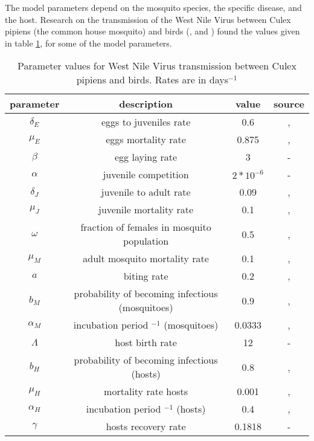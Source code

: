 \documentclass{article}
\begin{document}
The model parameters depend on the mosquito species, the specific disease, and the host. Research on the transmission of the West Nile Virus between Culex pipiens (the common house mosquito) and birds (\cite{Heidecke2024.09.16.613097}, and \cite{Vogels2017-li}) found the values given in table \ref{tab:parameters}, for some of the model parameters.
\begin{table}[h!]
\centering
\begin{tabular}{|c|c|c|c|}
\hline
\textbf{parameter} & \textbf{description} & \textbf{value} & \textbf{source}\\
\hline
$\delta_E$ & eggs to juveniles rate & 0.6 & \cite{Heidecke2024.09.16.613097}, \cite{Vogels2017-li}\\
$\mu_E$ & eggs mortality rate & 0.875 & \cite{Heidecke2024.09.16.613097}, \cite{Vogels2017-li}\\
$\beta$ & egg laying rate & 3 & -\\
$\alpha$ & juvenile competition & $2*10^{-6}$ & -\\
$\delta_J$ & juvenile to adult rate & 0.09 & \cite{Heidecke2024.09.16.613097}, \cite{Vogels2017-li}\\
$\mu_J$ & juvenile mortality rate & 0.1 & \cite{Heidecke2024.09.16.613097}, \cite{Vogels2017-li}\\
$\omega$ & fraction of females in mosquito population & 0.5 & \cite{Heidecke2024.09.16.613097}, \cite{Vogels2017-li}\\
$\mu_M$ & adult mosquito mortality rate & 0.1 & \cite{Heidecke2024.09.16.613097}, \cite{Vogels2017-li}\\
$a$ & biting rate & 0.2 & \cite{Heidecke2024.09.16.613097}, \cite{Vogels2017-li}\\
$b_M$ & probability of becoming infectious (mosquitoes) & 0.9 & \cite{Heidecke2024.09.16.613097}, \cite{Vogels2017-li}\\
$\alpha_M$ & incubation period $^{-1}$ (mosquitoes) & 0.0333 & \cite{Heidecke2024.09.16.613097}, \cite{Vogels2017-li}\\
$\Lambda$ & host birth rate & 12 & -\\
$b_H$ & probability of becoming infectious (hosts) & 0.8 & \cite{Heidecke2024.09.16.613097}, \cite{Vogels2017-li}\\
$\mu_H$ & mortality rate hosts & 0.001 & \cite{Heidecke2024.09.16.613097}, \cite{Vogels2017-li}\\
$\alpha_H$ & incubation period $^{-1}$ (hosts) & 0.4 & \cite{Heidecke2024.09.16.613097}, \cite{Vogels2017-li}\\
$\gamma$ & hosts recovery rate & 0.1818 & -\\
\hline
\end{tabular}
\caption{Parameter values for West Nile Virus transmission between Culex pipiens and birds. Rates are in days$^{-1}$}
\label{tab:parameters}
\end{table}
\end{document}
